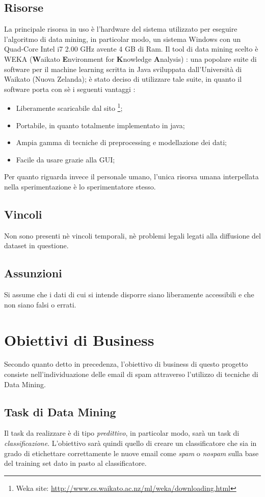 \subsection{Risorse}
La principale risorsa in uso è l'hardware del sistema utilizzato per eseguire l'algoritmo di data mining, in particolar modo, un sistema Windows con un Quad-Core Intel i7 2.00 GHz avente 4 GB di Ram.
Il tool di data mining scelto è WEKA (\textbf{W}aikato \textbf{E}nvironment for \textbf{K}nowledge \textbf{A}nalysis) \cite{WEKA}:
una popolare suite di software per il machine learning scritta in Java sviluppata dall'Università di Waikato (Nuova Zelanda); è stato deciso di utilizzare tale suite, in quanto il software porta con sè i seguenti vantaggi :
\begin{itemize}
	\item Liberamente scaricabile dal sito \footnote{Weka site: \url{http://www.cs.waikato.ac.nz/ml/weka/downloading.html}};
    \item Portabile, in quanto totalmente implementato in java;
    \item Ampia gamma di tecniche di preprocessing e modellazione dei dati;
    \item Facile da usare grazie alla GUI;
\end{itemize}
Per quanto riguarda invece il personale umano, l'unica risorsa umana interpellata nella sperimentazione è lo sperimentatore stesso.
\subsection{Vincoli}
	Non sono presenti nè vincoli temporali, nè problemi legali legati alla diffusione del dataset in questione.
\subsection{Assunzioni}
	Si assume che i dati di cui si intende disporre siano liberamente accessibili e che non siano falsi o errati.
\section{Obiettivi di Business}
	Secondo quanto detto in precedenza, l'obiettivo di business di questo progetto consiste nell'individuazione delle email di spam attraverso l'utilizzo di tecniche di Data Mining.

\subsection{Task di Data Mining}
	\label{task}
	Il task da realizzare è di tipo \textit{predittivo}, in particolar modo, sarà un task di \textit{classificazione}. L'obiettivo sarà quindi quello di creare un classificatore che sia in grado di etichettare correttamente le nuove email come \textit{spam} o \textit{nospam} sulla base del training set dato in pasto al classificatore. 

